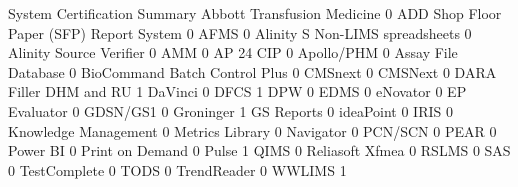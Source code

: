 \documentclass{article}
\begin{document}
\begin{Schunk}
\begin{Soutput}
                                           System Certification Summary
  Abbott Transfusion Medicine                                         0
  ADD Shop Floor Paper (SFP) Report System                            0
  AFMS                                                                0
  Alinity S Non-LIMS spreadsheets                                     0
  Alinity Source Verifier                                             0
  AMM                                                                 0
  AP 24 CIP                                                           0
  Apollo/PHM                                                          0
  Assay File Database                                                 0
  BioCommand Batch Control Plus                                       0
  CMSnext                                                             0
  CMSNext                                                             0
  DARA Filler DHM and RU                                              1
  DaVinci                                                             0
  DFCS                                                                1
  DPW                                                                 0
  EDMS                                                                0
  eNovator                                                            0
  EP Evaluator                                                        0
  GDSN/GS1                                                            0
  Groninger                                                           1
  GS Reports                                                          0
  ideaPoint                                                           0
  IRIS                                                                0
  Knowledge Management                                                0
  Metrics Library                                                     0
  Navigator                                                           0
  PCN/SCN                                                             0
  PEAR                                                                0
  Power BI                                                            0
  Print on Demand                                                     0
  Pulse                                                               1
  QIMS                                                                0
  Reliasoft Xfmea                                                     0
  RSLMS                                                               0
  SAS                                                                 0
  TestComplete                                                        0
  TODS                                                                0
  TrendReader                                                         0
  WWLIMS                                                              1
                                          

\end{Soutput}
\end{Schunk}
\end{document}
